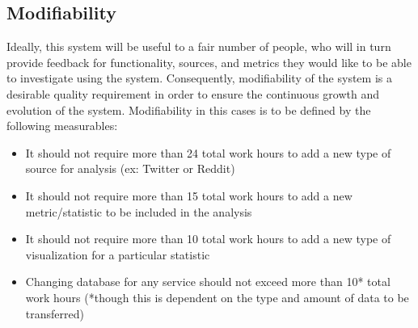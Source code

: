 \documentclass[12pt]{article}
\begin{document}
\subsection{Modifiability}
Ideally, this system will be useful to a fair number of people, who will in turn provide feedback for functionality, sources, and metrics they would like to be able to investigate using the system. Consequently, modifiability of the system is a desirable quality requirement in order to ensure the continuous growth and evolution of the system. Modifiability in this cases is to be defined by the following measurables:
\begin{itemize}
    \item It should not require more than 24 total work hours to add a new type of source for analysis (ex: Twitter or Reddit)
    \item It should not require more than 15 total work hours to add a new metric/statistic to be included in the analysis
    \item It should not require more than 10 total work hours to add a new type of visualization for a particular statistic
    \item Changing database for any service should not exceed more than 10* total work hours (*though this is dependent on the type and amount of data to be transferred)
\end{itemize}
\end{document}
